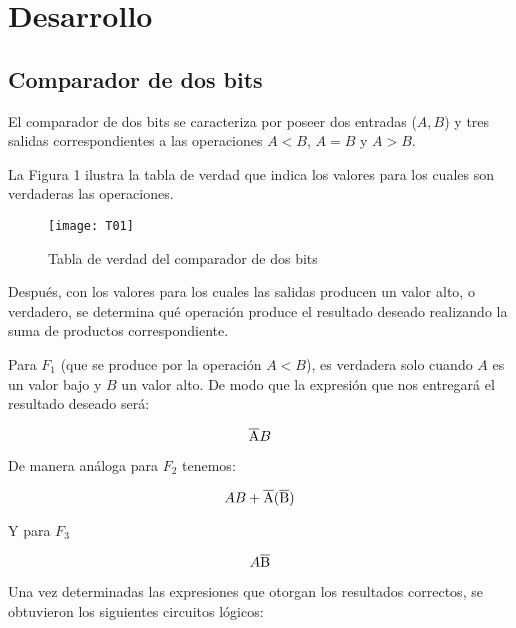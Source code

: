 \documentclass[a4paper,12pt]{article}
\begin{document}
%
%
%
%

\section{Desarrollo}

\subsection{Comparador de dos bits}

El comparador de dos bits se caracteriza por poseer dos entradas ($A, B$) y tres salidas correspondientes a las operaciones $A < B$, $A = B$ y $A > B$.\par

La Figura 1 ilustra la tabla de verdad que indica los valores para los cuales son verdaderas las operaciones.\par

\begin{figure}[ht!]
	\centering

	\texttt{[image: T01]}

	\caption{Tabla de verdad del comparador de dos bits}
\end{figure}

Después, con los valores para los cuales las salidas producen un valor alto, o verdadero, se determina qué operación produce el resultado deseado realizando la suma de productos correspondiente.\par

Para $F_1$ (que se produce por la operación $A < B$), es verdadera solo cuando $A$ es un valor bajo y $B$ un valor alto. De modo que la expresión que nos entregará el resultado deseado será:\par

\[ \overline{\rm A}B \]\par

De manera análoga para $F_2$ tenemos:

\[ AB + \overline{\rm A} (\overline{\rm B}) \]\par

Y para $F_3$

\[ A\overline{\rm B} \]\par


Una vez determinadas las expresiones que otorgan los resultados correctos, se obtuvieron los siguientes circuitos lógicos:\par

\vspace{1cm}
\end{document}
